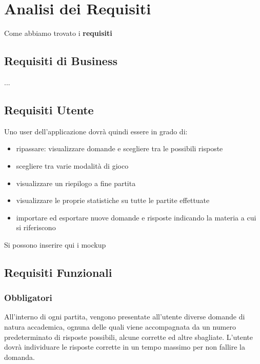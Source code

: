 

\chapter{Analisi dei Requisiti}
Come abbiamo trovato i \textbf{requisiti}
	\section{Requisiti di Business}
	...
	
	\section{Requisiti Utente}
    Uno user dell'applicazione dovrà quindi essere in grado di:
    \begin{itemize}
        \item ripassare: visualizzare domande e scegliere tra le possibili risposte
        \item scegliere tra varie modalità di gioco
        \item visualizzare un riepilogo a fine partita
        \item visualizzare le proprie statistiche su tutte le partite effettuate
        \item importare ed esportare nuove domande e risposte indicando la materia a cui si riferiscono
    \end{itemize}
 
	Si possono inserire qui i mockup
	    
	\section{Requisiti Funzionali} 
        \subsection{Obbligatori}
        All’interno di ogni partita, vengono presentate all’utente diverse domande di natura accademica, ognuna delle quali viene accompagnata da un numero predeterminato di risposte possibili, alcune corrette ed altre sbagliate. L’utente dovrà individuare le risposte corrette in un tempo massimo per non fallire la domanda. 

